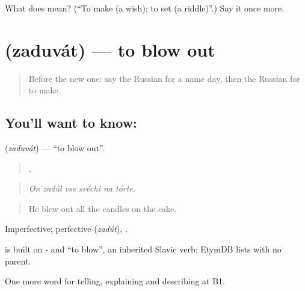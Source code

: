 \begin{tcolorbox}[breakable,colback=teal!4,colframe=teal!35!black,title={Before you move on}]
What does  mean? (\textquotedblleft{}To make (a wish); to set (a riddle)\textquotedblright{}.) Say it once more.
\end{tcolorbox}
\section[\texorpdfstring{\ru{задувать} (zaduvát)}{задувать (zaduvát)}]{ (zaduvát) — to blow out}

\label{lesson:RU-C317-zaduvat}



\begin{quote}
Before the new one: say the Russian for a name day, then the Russian for to make.
\end{quote}

\subsection*{You'll want to know: }
\textbf{} (\emph{zaduvát}) — \textquotedblleft{}to blow out\textquotedblright{}.

\begin{quote}
     .
\end{quote}

\begin{quote}
\emph{On zadúl vse svéchi na tórte.}
\end{quote}

\begin{quote}
He blew out all the candles on the cake.
\end{quote}

Imperfective; perfective \emph{} (\emph{zadút}), \emph{}.

\begin{cousinweb}
\emph{} is built on \emph{-} and \emph{} \textquotedblleft{}to blow\textquotedblright{}, an inherited Slavic verb; EtymDB lists \emph{} with no parent.
\end{cousinweb}

\begin{grammarlens}[title={What you've built}]
One more word for telling, explaining and describing at B1.
\end{grammarlens}

